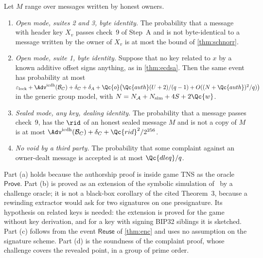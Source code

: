 \begin{theorem}\label{thm:auth}
Let $M$ range over messages written by honest owners.
\begin{enumerate}[leftmargin=1.9em,itemsep=2pt,label=\textup{(\alph*)}]
\item \emph{Open mode, suites 2 and 3, byte identity.} The probability that a message with header key $X_v$ passes check~9 of Step~A and is not byte-identical to a message written by the owner of $X_v$ is at most the bound of \cref{thm:schnorr}.
\item \emph{Open mode, suite 1, byte identity.} Suppose that no key related to $x$ by a known additive offset signs anything, as in \cref{thm:ecdsa}. Then the same event has probability at most
$\varepsilon_{\mathrm{lock}} + \Adv^{\mathrm{icdh}}(\mathcal{B}_C) + \delta_C + \delta_A + \Qc{o}\bigl(\Qc{auth}(U+2)/(q-1) + O((N + \Qc{auth})^2/q)\bigr)$
in the generic group model, with $N = N_{\mathcal{A}} + N_{\mathrm{sim}} + 4S + 2\Qc{w}$.
\item \emph{Sealed mode, any key, dealing identity.} The probability that a message passes check~9, has the $\rid$ of an honest sealed message $M$ and is not a copy of $M$ is at most $\Adv^{\mathrm{icdh}}(\mathcal{B}_C) + \delta_C + \Qc{rid}^2/2^{256}$.
\item \emph{No void by a third party.} The probability that some complaint against an owner-dealt message is accepted is at most $\Qc{dleq}/q$.
\end{enumerate}
\end{theorem}

Part (a) holds because the authorship proof is inside game TNS as the oracle $\mathsf{Prove}$. Part (b) is proved as an extension of the symbolic simulation of~\cite{GS21} by a challenge oracle; it is not a black-box corollary of the cited Theorem~3, because a rewinding extractor would ask for two signatures on one presignature. Its hypothesis on related keys is needed: the extension is proved for the game without key derivation, and for a key with signing BIP32 siblings it is sketched. Part (c) follows from the event $\mathsf{Reuse}$ of \cref{thm:enc} and uses no assumption on the signature scheme. Part (d) is the soundness of the complaint proof, whose challenge covers the revealed point, in a group of prime order.

